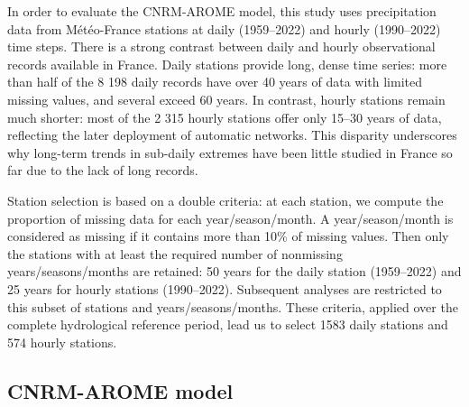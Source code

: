 \documentclass[french,a4paper,DIV=11,numbers=noendperiod]{scrartcl}
\begin{document}
In order to evaluate the CNRM-AROME model, this study uses precipitation data from Météo-France stations
\parencite{meteofrance2024} at daily (1959--2022) and hourly (1990--2022) time
steps. There is a strong contrast between daily and hourly observational records available in France. Daily stations provide long, dense time series: more than half of the 8 198 daily records have over 40 years of data with limited missing values, and several exceed 60 years. In contrast, hourly stations remain much shorter: most of the 2 315 hourly stations offer only 15–30 years of data, reflecting the later deployment of automatic networks. This disparity underscores why long-term trends in sub-daily extremes have been little studied in France so far due to the lack of long records.  

Station selection is based on a double criteria: at each station, we compute the proportion of missing data for each year/season/month. A year/season/month is considered as missing if it contains more than 10\% of missing values. Then only the stations with at least the required number of nonmissing years/seasons/months are retained: 50 years for the daily station (1959--2022) and 25 years for hourly stations (1990--2022). Subsequent
analyses are restricted to this subset of stations and years/seasons/months. These criteria, applied over the complete hydrological reference period, lead us to select 1583 daily stations and 574 hourly stations.

\subsection{CNRM-AROME model}\label{arome-model}

\end{document}
